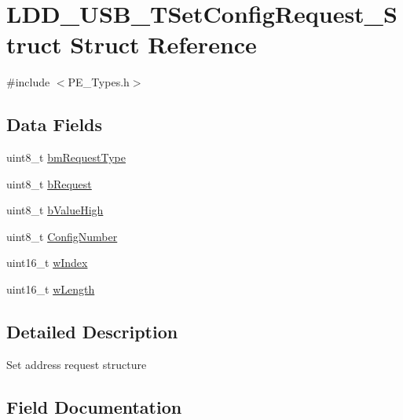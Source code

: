 \hypertarget{struct_l_d_d___u_s_b___t_set_config_request___struct}{}\section{L\+D\+D\+\_\+\+U\+S\+B\+\_\+\+T\+Set\+Config\+Request\+\_\+\+Struct Struct Reference}
\label{struct_l_d_d___u_s_b___t_set_config_request___struct}


{\ttfamily \#include $<$P\+E\+\_\+\+Types.\+h$>$}

\subsection*{Data Fields}
\begin{DoxyCompactItemize}
\item 
uint8\+\_\+t \hyperlink{struct_l_d_d___u_s_b___t_set_config_request___struct_aa3e4ca8e83424e5496478991dac0361a}{bm\+Request\+Type}
\item 
uint8\+\_\+t \hyperlink{struct_l_d_d___u_s_b___t_set_config_request___struct_a12a9d3e8bd01f75b681c1749d2595f42}{b\+Request}
\item 
uint8\+\_\+t \hyperlink{struct_l_d_d___u_s_b___t_set_config_request___struct_a55df59e0060cfd0bc6e9bdc53b9a0d99}{b\+Value\+High}
\item 
uint8\+\_\+t \hyperlink{struct_l_d_d___u_s_b___t_set_config_request___struct_a9a545d7858a7ee85dbe37eaf2b4b7e01}{Config\+Number}
\item 
uint16\+\_\+t \hyperlink{struct_l_d_d___u_s_b___t_set_config_request___struct_ad2aa2851b128777e842b2ac796d2f664}{w\+Index}
\item 
uint16\+\_\+t \hyperlink{struct_l_d_d___u_s_b___t_set_config_request___struct_a66312977eb5816459d0201a2bacaf9b5}{w\+Length}
\end{DoxyCompactItemize}


\subsection{Detailed Description}
Set address request structure 

\subsection{Field Documentation}
